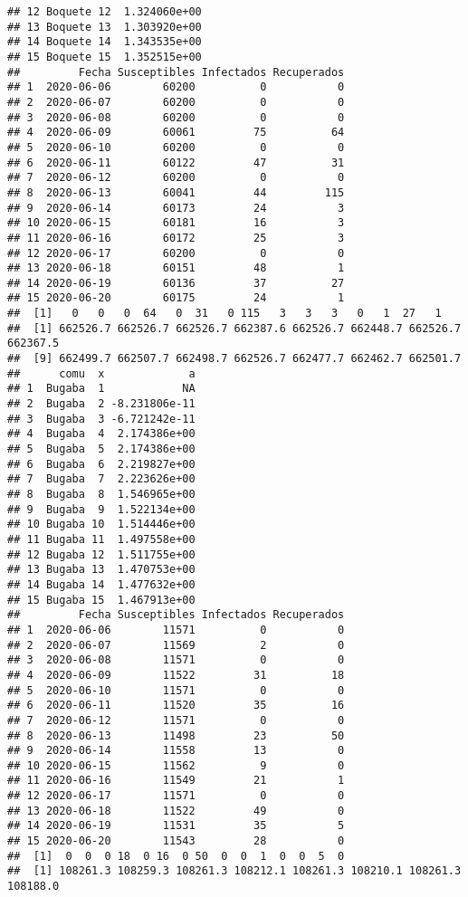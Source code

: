 \documentclass[
]{article}
\begin{document}
\begin{verbatim}
## 12 Boquete 12  1.324060e+00
## 13 Boquete 13  1.303920e+00
## 14 Boquete 14  1.343535e+00
## 15 Boquete 15  1.352515e+00
##         Fecha Susceptibles Infectados Recuperados
## 1  2020-06-06        60200          0           0
## 2  2020-06-07        60200          0           0
## 3  2020-06-08        60200          0           0
## 4  2020-06-09        60061         75          64
## 5  2020-06-10        60200          0           0
## 6  2020-06-11        60122         47          31
## 7  2020-06-12        60200          0           0
## 8  2020-06-13        60041         44         115
## 9  2020-06-14        60173         24           3
## 10 2020-06-15        60181         16           3
## 11 2020-06-16        60172         25           3
## 12 2020-06-17        60200          0           0
## 13 2020-06-18        60151         48           1
## 14 2020-06-19        60136         37          27
## 15 2020-06-20        60175         24           1
##  [1]   0   0   0  64   0  31   0 115   3   3   3   0   1  27   1
##  [1] 662526.7 662526.7 662526.7 662387.6 662526.7 662448.7 662526.7 662367.5
##  [9] 662499.7 662507.7 662498.7 662526.7 662477.7 662462.7 662501.7
##      comu  x             a
## 1  Bugaba  1            NA
## 2  Bugaba  2 -8.231806e-11
## 3  Bugaba  3 -6.721242e-11
## 4  Bugaba  4  2.174386e+00
## 5  Bugaba  5  2.174386e+00
## 6  Bugaba  6  2.219827e+00
## 7  Bugaba  7  2.223626e+00
## 8  Bugaba  8  1.546965e+00
## 9  Bugaba  9  1.522134e+00
## 10 Bugaba 10  1.514446e+00
## 11 Bugaba 11  1.497558e+00
## 12 Bugaba 12  1.511755e+00
## 13 Bugaba 13  1.470753e+00
## 14 Bugaba 14  1.477632e+00
## 15 Bugaba 15  1.467913e+00
##         Fecha Susceptibles Infectados Recuperados
## 1  2020-06-06        11571          0           0
## 2  2020-06-07        11569          2           0
## 3  2020-06-08        11571          0           0
## 4  2020-06-09        11522         31          18
## 5  2020-06-10        11571          0           0
## 6  2020-06-11        11520         35          16
## 7  2020-06-12        11571          0           0
## 8  2020-06-13        11498         23          50
## 9  2020-06-14        11558         13           0
## 10 2020-06-15        11562          9           0
## 11 2020-06-16        11549         21           1
## 12 2020-06-17        11571          0           0
## 13 2020-06-18        11522         49           0
## 14 2020-06-19        11531         35           5
## 15 2020-06-20        11543         28           0
##  [1]  0  0  0 18  0 16  0 50  0  0  1  0  0  5  0
##  [1] 108261.3 108259.3 108261.3 108212.1 108261.3 108210.1 108261.3 108188.0

\end{verbatim}
\end{document}
